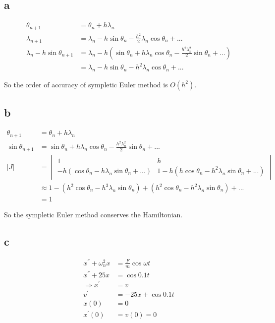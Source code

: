 \documentclass[letterpaper,10pt]{article}
\begin{document}
\subsection{a}
\begin{align*}
  \theta_{n+1} &= \theta_n+h\lambda_n\\
  \lambda_{n+1} &= \lambda_n -h \sin \theta_n - \frac{h^2}{2}\lambda_n \cos\theta_n +...\\
  \lambda_n-h\sin \theta_{n+1} &= \lambda_n-h\left(\sin \theta_n + h\lambda_n \cos \theta_n-\frac{h^2\lambda_n^2}{2}\sin \theta_n+...\right)\\
  &=\lambda_n-h\sin \theta_n - h^2\lambda_n \cos \theta_n+...
\end{align*}

So the order of accuracy of sympletic Euler method is $O(h^2)$. 
\subsection{b}
\begin{align*}
  \theta_{n+1} &= \theta_n+h\lambda_n\\
  \sin \theta_{n+1} &= \sin \theta_n + h\lambda_n \cos \theta_n-\frac{h^2\lambda_n^2}{2}\sin \theta_n+...\\
  |J|&=\begin{vmatrix}
    1&h\\-h(\cos \theta_n - h\lambda_n \sin \theta_n+...)&1-h(h\cos \theta_n-h^2\lambda_n\sin \theta_n+...)
  \end{vmatrix}\\
  &\approx 1-(h^2\cos \theta_n-h^3\lambda_n\sin \theta_n)+(h^2\cos \theta_n-h^2\lambda_n \sin \theta_n)+...\\
  &=1
\end{align*}

So the sympletic Euler method conserves the Hamiltonian. 
\subsection{c}
\begin{align*}
  x^{''}+\omega_n^2x&=\frac{F}{m}\cos \omega t\\
  x^{''}+25x&=\cos 0.1 t\\
  \Rightarrow x^{'}&=v\\
  v^{'}&=-25x+\cos 0.1t\\
  x(0)&=0\\
  x^{'}(0)&=v(0)=0
\end{align*}
\end{document}
